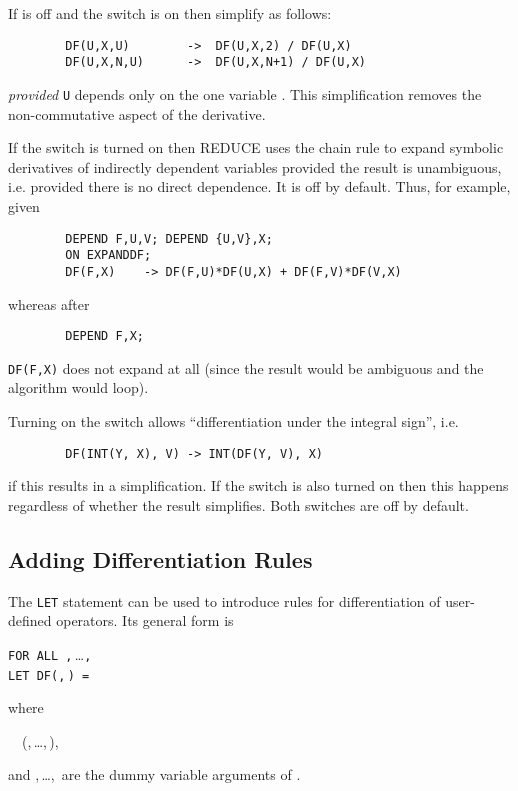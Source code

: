 If  is off and the switch 
is on then simplify as follows:
\begin{verbatim}
        DF(U,X,U)        ->  DF(U,X,2) / DF(U,X)
        DF(U,X,N,U)      ->  DF(U,X,N+1) / DF(U,X)
\end{verbatim}
\emph{provided} \texttt{U} depends only on the one variable .
This simplification removes the non-commutative aspect of the derivative.

\hypertarget{switch:EXPANDDF}{}
If the switch  is turned on then REDUCE uses
the chain rule to expand symbolic derivatives of indirectly dependent variables
provided the result is unambiguous, i.e. provided there is no direct dependence.
It is off by default.  Thus, for example, given
\begin{verbatim}
        DEPEND F,U,V; DEPEND {U,V},X;
        ON EXPANDDF;
        DF(F,X)    -> DF(F,U)*DF(U,X) + DF(F,V)*DF(V,X)
\end{verbatim}
whereas after
\begin{verbatim}
        DEPEND F,X;
\end{verbatim}
\texttt{DF(F,X)} does not expand at all (since the result would be ambiguous
and the algorithm would loop).

\hypertarget{switch:ALLOWDFINT}{}
\hypertarget{switch:DFINT}{}
Turning on the switch  allows
``differentiation under the integral sign'', i.e.
\begin{verbatim}
        DF(INT(Y, X), V) -> INT(DF(Y, V), X)
\end{verbatim}
if this results in a simplification.  If the switch 
is also turned on then this happens regardless of whether the result
simplifies. Both switches are off by default.


\subsection{Adding Differentiation Rules}
\hypertarget{command:LETdf}{}

The \texttt{LET} statement can be used to introduce
rules for differentiation of user-defined operators.  Its general form is
\begin{syntaxtable}
  \texttt{FOR ALL }\texttt{,}\,\dots\texttt{,}\, \\
    \qquad \texttt{LET DF(}\texttt{,}\,\texttt{)
    = }
\end{syntaxtable}
where
\begin{syntax}
  \ \BNFprod\ (,\,\dots,\,),
\end{syntax}
and
,\,\dots,\, are the dummy variable arguments of
.


